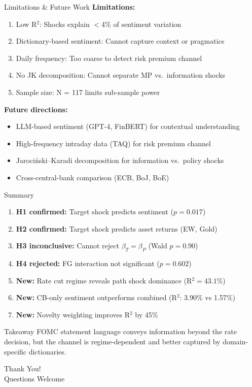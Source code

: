 \documentclass[aspectratio=169, 11pt]{beamer}
\begin{document}
\begin{frame}{Limitations \& Future Work}
  \textbf{Limitations:}
  \begin{enumerate}
    \item Low R$^2$: Shocks explain $<$4\% of sentiment variation
    \item Dictionary-based sentiment: Cannot capture context or pragmatics
    \item Daily frequency: Too coarse to detect risk premium channel
    \item No JK decomposition: Cannot separate MP vs.\ information shocks
    \item Sample size: N = 117 limits sub-sample power
  \end{enumerate}

  \vspace{0.5em}
  \textbf{Future directions:}
  \begin{itemize}
    \item LLM-based sentiment (GPT-4, FinBERT) for contextual understanding
    \item High-frequency intraday data (TAQ) for risk premium channel
    \item Jaroci\'{n}ski--Karadi decomposition for information vs.\ policy shocks
    \item Cross-central-bank comparison (ECB, BoJ, BoE)
  \end{itemize}
\end{frame}

\begin{frame}{Summary}
  \begin{enumerate}
    \item[\ding{51}] \textbf{H1 confirmed:} Target shock predicts sentiment ($p = 0.017$)
    \item[\ding{51}] \textbf{H2 confirmed:} Target shock predicts asset returns (EW, Gold)
    \item[\ding{111}] \textbf{H3 inconclusive:} Cannot reject $\beta_T = \beta_P$ (Wald $p = 0.90$)
    \item[\ding{111}] \textbf{H4 rejected:} FG interaction not significant ($p = 0.602$)
    \item[\ding{51}] \textbf{New:} Rate cut regime reveals path shock dominance (R$^2 = 43.1\%$)
    \item[\ding{51}] \textbf{New:} CB-only sentiment outperforms combined (R$^2$: 3.90\% vs 1.57\%)
    \item[\ding{51}] \textbf{New:} Novelty weighting improves R$^2$ by 45\%
  \end{enumerate}

  \vspace{0.5em}
  \begin{block}{Takeaway}
    FOMC statement language conveys information beyond the rate decision, but the channel is regime-dependent and better captured by domain-specific dictionaries.
  \end{block}
\end{frame}

\begin{frame}
  \centering
  \Large Thank You!\\[0.8em]
  \normalsize Questions Welcome
\end{frame}
\end{document}
